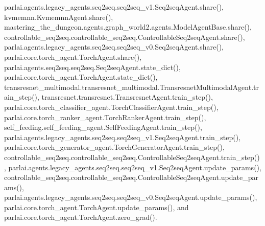 parlai.\+agents.\+legacy\+\_\+agents.\+seq2seq.\+seq2seq\+\_\+v1.\+Seq2seq\+Agent.\+share(), kvmemnn.\+Kvmemnn\+Agent.\+share(), mastering\+\_\+the\+\_\+dungeon.\+agents.\+graph\+\_\+world2.\+agents.\+Model\+Agent\+Base.\+share(), controllable\+\_\+seq2seq.\+controllable\+\_\+seq2seq.\+Controllable\+Seq2seq\+Agent.\+share(), parlai.\+agents.\+legacy\+\_\+agents.\+seq2seq.\+seq2seq\+\_\+v0.\+Seq2seq\+Agent.\+share(), parlai.\+core.\+torch\+\_\+agent.\+Torch\+Agent.\+share(), parlai.\+agents.\+seq2seq.\+seq2seq.\+Seq2seq\+Agent.\+state\+\_\+dict(), parlai.\+core.\+torch\+\_\+agent.\+Torch\+Agent.\+state\+\_\+dict(), transresnet\+\_\+multimodal.\+transresnet\+\_\+multimodal.\+Transresnet\+Multimodal\+Agent.\+train\+\_\+step(), transresnet.\+transresnet.\+Transresnet\+Agent.\+train\+\_\+step(), parlai.\+core.\+torch\+\_\+classifier\+\_\+agent.\+Torch\+Classifier\+Agent.\+train\+\_\+step(), parlai.\+core.\+torch\+\_\+ranker\+\_\+agent.\+Torch\+Ranker\+Agent.\+train\+\_\+step(), self\+\_\+feeding.\+self\+\_\+feeding\+\_\+agent.\+Self\+Feeding\+Agent.\+train\+\_\+step(), parlai.\+agents.\+legacy\+\_\+agents.\+seq2seq.\+seq2seq\+\_\+v1.\+Seq2seq\+Agent.\+train\+\_\+step(), parlai.\+core.\+torch\+\_\+generator\+\_\+agent.\+Torch\+Generator\+Agent.\+train\+\_\+step(), controllable\+\_\+seq2seq.\+controllable\+\_\+seq2seq.\+Controllable\+Seq2seq\+Agent.\+train\+\_\+step(), parlai.\+agents.\+legacy\+\_\+agents.\+seq2seq.\+seq2seq\+\_\+v1.\+Seq2seq\+Agent.\+update\+\_\+params(), controllable\+\_\+seq2seq.\+controllable\+\_\+seq2seq.\+Controllable\+Seq2seq\+Agent.\+update\+\_\+params(), parlai.\+agents.\+legacy\+\_\+agents.\+seq2seq.\+seq2seq\+\_\+v0.\+Seq2seq\+Agent.\+update\+\_\+params(), parlai.\+core.\+torch\+\_\+agent.\+Torch\+Agent.\+update\+\_\+params(), and parlai.\+core.\+torch\+\_\+agent.\+Torch\+Agent.\+zero\+\_\+grad().

\mbox{\label{classparlai_1_1agents_1_1legacy__agents_1_1seq2seq_1_1seq2seq__v0_1_1Seq2seqAgent_a203f77c92dd9f343cd7c5580756d5e5a}} 
